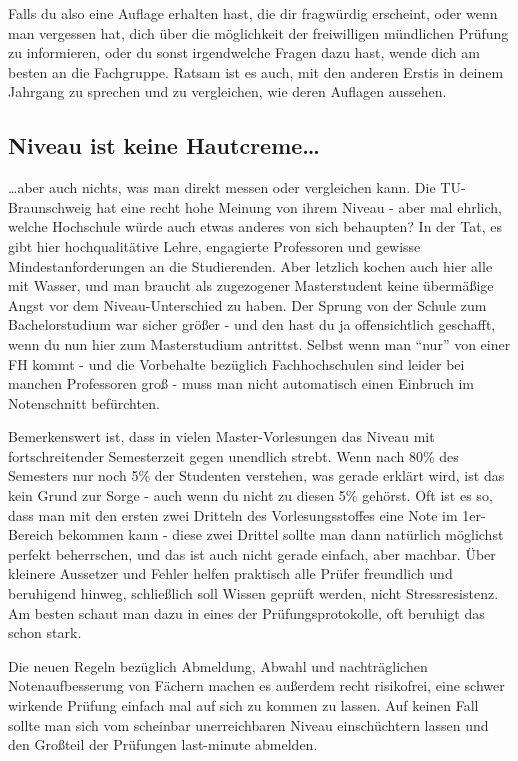 Falls du also eine Auflage erhalten hast, die dir fragwürdig erscheint, oder wenn man vergessen hat, dich über die möglichkeit der freiwilligen mündlichen Prüfung zu informieren, oder du sonst irgendwelche Fragen dazu hast, wende dich am besten an die Fachgruppe. Ratsam ist es auch, mit den anderen Erstis in deinem Jahrgang zu sprechen und zu vergleichen, wie deren Auflagen aussehen.

\subsection{Niveau ist keine Hautcreme\ldots}
\ldots aber auch nichts, was man direkt messen oder vergleichen kann. Die TU-Braunschweig hat eine recht hohe Meinung von ihrem Niveau - aber mal ehrlich, welche Hochschule würde auch etwas anderes von sich behaupten? In der Tat, es gibt hier hochqualitätive Lehre, engagierte Professoren und gewisse Mindestanforderungen an die Studierenden. Aber letzlich kochen auch hier alle mit Wasser, und man braucht als zugezogener Masterstudent keine übermäßige Angst vor dem Niveau-Unterschied zu haben. Der Sprung von der Schule zum Bachelorstudium war sicher größer - und den hast du ja offensichtlich geschafft, wenn du nun hier zum Masterstudium antrittst. Selbst wenn man "`nur"' von einer FH kommt - und die Vorbehalte bezüglich Fachhochschulen sind leider bei manchen Professoren groß - muss man nicht automatisch einen Einbruch im Notenschnitt befürchten.

Bemerkenswert ist, dass in vielen Master-Vorlesungen das Niveau mit fortschreitender Semesterzeit gegen unendlich strebt. Wenn nach 80\% des Semesters nur noch 5\% der Studenten verstehen, was gerade erklärt wird, ist das kein Grund zur Sorge - auch wenn du nicht zu diesen 5\% gehörst. Oft ist es so, dass man mit den ersten zwei Dritteln des Vorlesungsstoffes eine Note im 1er-Bereich bekommen kann - diese zwei Drittel sollte man dann natürlich möglichst perfekt beherrschen, und das ist auch nicht gerade einfach, aber machbar. Über kleinere Aussetzer und Fehler helfen praktisch alle Prüfer freundlich und beruhigend hinweg, schließlich soll Wissen geprüft werden, nicht Stressresistenz. Am besten schaut man dazu in eines der Prüfungsprotokolle, oft beruhigt das schon stark.

Die neuen Regeln bezüglich Abmeldung, Abwahl und nachträglichen Notenaufbesserung von Fächern machen es außerdem recht risikofrei, eine schwer wirkende Prüfung einfach mal auf sich zu kommen zu lassen. Auf keinen Fall sollte man sich vom scheinbar unerreichbaren Niveau einschüchtern lassen und den Großteil der Prüfungen last-minute abmelden.

